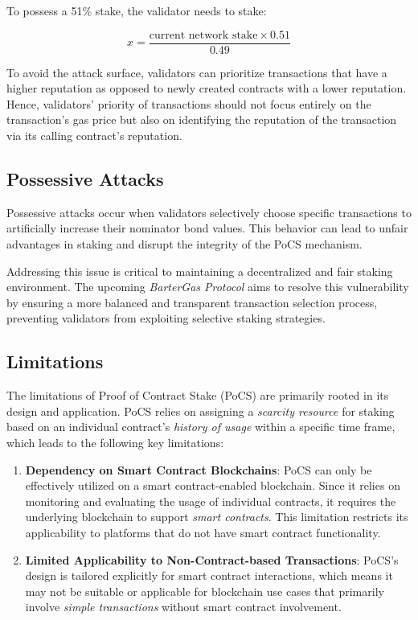 \documentclass{article}
\begin{document}
To possess a 51\% stake, the validator needs to stake:

\[
x=\frac{\text{current network stake} \times 0.51}{0.49}
\]

To avoid the attack surface, validators can prioritize transactions that have a higher reputation as opposed to newly created contracts with a lower reputation. Hence, validators' priority of transactions should not focus entirely on the transaction's gas price but also on identifying the reputation of the transaction via its calling contract's reputation.

\subsection{Possessive Attacks}

Possessive attacks occur when validators selectively choose specific transactions to artificially increase their nominator bond values. This behavior can lead to unfair advantages in staking and disrupt the integrity of the PoCS mechanism. 

Addressing this issue is critical to maintaining a decentralized and fair staking environment. The upcoming \textit{BarterGas Protocol} aims to resolve this vulnerability by ensuring a more balanced and transparent transaction selection process, preventing validators from exploiting selective staking strategies.

\subsection{Limitations}

The limitations of Proof of Contract Stake (PoCS) are primarily rooted in its design and application. PoCS relies on assigning a \textit{scarcity resource} for staking based on an individual contract's \textit{history of usage} within a specific time frame, which leads to the following key limitations:

\begin{enumerate}
    \item \textbf{Dependency on Smart Contract Blockchains}: PoCS can only be effectively utilized on a smart contract-enabled blockchain. Since it relies on monitoring and evaluating the usage of individual contracts, it requires the underlying blockchain to support \textit{smart contracts}. This limitation restricts its applicability to platforms that do not have smart contract functionality.
    \item \textbf{Limited Applicability to Non-Contract-based Transactions}: PoCS's design is tailored explicitly for smart contract interactions, which means it may not be suitable or applicable for blockchain use cases that primarily involve \textit{simple transactions} without smart contract involvement.
\end{enumerate}
\end{document}
